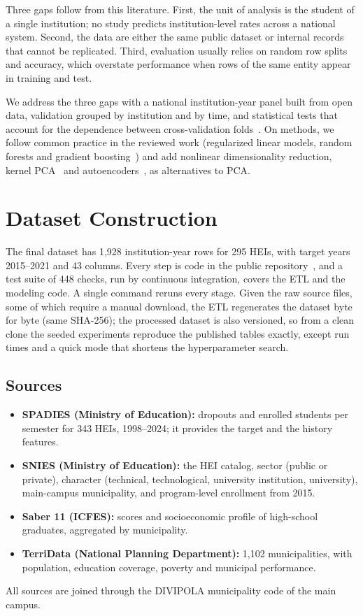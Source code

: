 \documentclass[conference]{IEEEtran}
\begin{document}
Three gaps follow from this literature. First, the unit of analysis is the student of a single institution; no study predicts institution-level rates across a national system. Second, the data are either the same public dataset or internal records that cannot be replicated. Third, evaluation usually relies on random row splits and accuracy, which overstate performance when rows of the same entity appear in training and test.

We address the three gaps with a national institution-year panel built from open data, validation grouped by institution and by time, and statistical tests that account for the dependence between cross-validation folds~\cite{nadeau2003}. On methods, we follow common practice in the reviewed work (regularized linear models, random forests and gradient boosting~\cite{pedregosa2011,chen2016}) and add nonlinear dimensionality reduction, kernel PCA~\cite{scholkopf1998} and autoencoders~\cite{hinton2006}, as alternatives to PCA.

\section{Dataset Construction}

The final dataset has 1,928 institution-year rows for 295 HEIs, with target years 2015--2021 and 43 columns. Every step is code in the public repository~\cite{repo}, and a test suite of 448 checks, run by continuous integration, covers the ETL and the modeling code. A single command reruns every stage. Given the raw source files, some of which require a manual download, the ETL regenerates the dataset byte for byte (same SHA-256); the processed dataset is also versioned, so from a clean clone the seeded experiments reproduce the published tables exactly, except run times and a quick mode that shortens the hyperparameter search.

\subsection{Sources}
\begin{itemize}
\item \textbf{SPADIES (Ministry of Education):} dropouts and enrolled students per semester for 343 HEIs, 1998--2024; it provides the target and the history features.
\item \textbf{SNIES (Ministry of Education):} the HEI catalog, sector (public or private), character (technical, technological, university institution, university), main-campus municipality, and program-level enrollment from 2015.
\item \textbf{Saber 11 (ICFES):} scores and socioeconomic profile of high-school graduates, aggregated by municipality.
\item \textbf{TerriData (National Planning Department):} 1,102 municipalities, with population, education coverage, poverty and municipal performance.
\end{itemize}
All sources are joined through the DIVIPOLA municipality code of the main campus.
\end{document}
